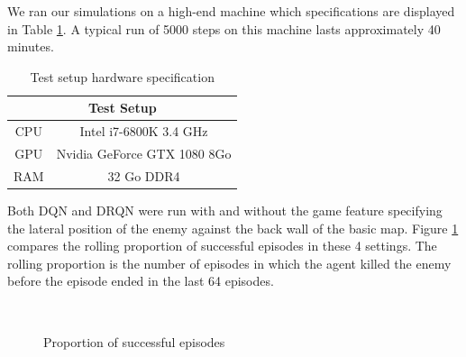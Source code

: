 \documentclass[letterpaper]{article}
\newcommand\Tstrut{\rule{0pt}{2.6ex}}
\begin{document}
We ran our simulations on a  high-end machine which specifications are displayed in Table \ref{tab:specs}.
A typical run of 5000 steps on this machine lasts approximately 40 minutes.

\begin{table}[h]
\centering
\begin{tabular}{cc}
\multicolumn{2}{c}{Test Setup}                         \Tstrut\\ \hline
\multicolumn{1}{c|}{CPU} & Intel i7-6800K 3.4 GHz      \Tstrut\\
\multicolumn{1}{c|}{GPU} & Nvidia GeForce GTX 1080 8Go \Tstrut\\
\multicolumn{1}{c|}{RAM} & 32 Go DDR4                      \Tstrut
\end{tabular}
\caption{Test setup hardware specification}
\label{tab:specs}
\end{table}


Both DQN and DRQN were run with and without the game feature specifying the
lateral position of the enemy against the back wall of the basic map. Figure
\ref{successrate} compares the rolling proportion of successful episodes
in these 4 settings. The rolling proportion is the number of episodes in which
the agent killed the enemy before the episode ended in the last 64 episodes.

\begin{figure}
	\\
	\caption{Proportion of successful episodes}
	\label{successrate}
\end{figure}
\end{document}
